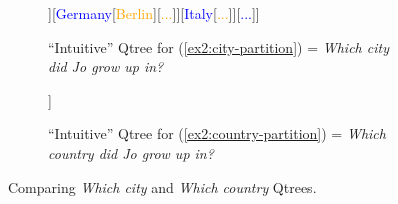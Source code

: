 \begin{figure}[H]
	\centering
	\begin{subfigure}[t]{.45\linewidth}
		\centering
		\begin{forest}
			[{CS\\
				Jo grew up in...}[\textcolor{blue}{France}[\textcolor{orange}{{Paris}}][\textcolor{orange}{Lyon}][\textcolor{orange}{...}]][\textcolor{blue}{Germany}[\textcolor{orange}{Berlin}][\textcolor{orange}{...}]][\textcolor{blue}{Italy}[\textcolor{orange}{...}]][\textcolor{blue}{...}]]
		\end{forest}
		\caption{``Intuitive'' Qtree for (\ref{ex2:city-partition}) = \textit{Which city did Jo grow up in?}}\label{fig2:city-qtree-repeated2}
	\end{subfigure}\hfill
	\begin{subfigure}[t]{.45\linewidth}
		\centering
		\begin{forest}
			[{CS\\
				Jo grew up in...}[\textcolor{blue}{France}][\textcolor{blue}{Germany}][\textcolor{blue}{Italy}][\textcolor{blue}{...}]]
		\end{forest}
		\caption{``Intuitive'' Qtree for (\ref{ex2:country-partition}) = \textit{Which country did Jo grow up in?}}\label{fig2:country-qtree}
	\end{subfigure}
	\caption{Comparing \textit{Which city} and \textit{Which country} Qtrees.}\label{fig2:qtrees-diff-gran}
\end{figure}

